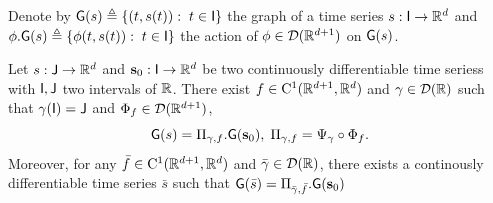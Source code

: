   Denote by $\mathsf{G}(s)\triangleq \{ (t,s(t)): \; t\in \mathsf{I} \} $ the graph of a time series $s: \mathsf{I} \to \mathbb{R}^d$ and $ \phi.\mathsf{G}(s)\triangleq\{ \phi(t,s(t)): \; t\in \mathsf{I}\} $ the action of  $\phi\in \mathcal{D}(\mathbb{R}^{d+1}) $ on $\mathsf{G}(s)$.
    \begin{theorem}
        \label{theorem:representation}
    Let $s:  \mathsf{J} \to \mathbb{R}^d  $ and $\mathbf{s}_0: \mathsf{I}\to \mathbb{R}^d $ be two continuously differentiable time seriess with $\mathsf{I},\mathsf{J}$ two intervals of $\mathbb{R}$.
     There exist $f\in \mathrm{C}^1(\mathbb{R}^{d+1},\mathbb{R}^d)$ and $\gamma\in  \mathcal{D}(\mathbb{R}) $ such that $\gamma(\mathsf{I})=\mathsf{J} $ and $\Phi_f\in \mathcal{D}(\mathbb{R}^{d+1})$,
     \begin{equation}
        \mathsf{G}(s)= \Pi_{\gamma,f}.\mathsf{G}(\mathbf{s}_0),\; \Pi_{\gamma,f}=\Psi_\gamma\circ\Phi_f.
     \end{equation}
     Moreover, for any $\bar{f}\in \mathrm{C}^1(\mathbb{R}^{d+1},\mathbb{R}^d)$ and $\bar{\gamma}\in  \mathcal{D}(\mathbb{R}) $, there exists a continously differentiable time series $\bar{s}$ such that 
     $\mathsf{G}(\bar{s})= \Pi_{\bar{\gamma},\bar{f}}.\mathsf{G}(\mathbf{s}_0)$
    \end{theorem}
        
